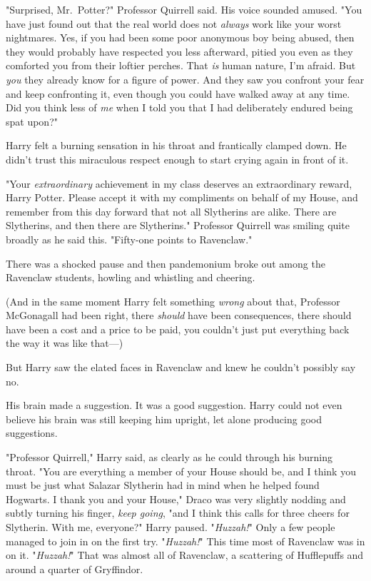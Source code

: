 "Surprised, Mr.~Potter?" Professor Quirrell said. His voice sounded amused. 
"You have just found out that the real world does not \emph{always} work like 
your worst nightmares. Yes, if you had been some poor anonymous boy being 
abused, then they would probably have respected you less afterward, pitied you 
even as they comforted you from their loftier perches. That \emph{is} human 
nature, I'm afraid. But \emph{you} they already know for a figure of power. And 
they saw you confront your fear and keep confronting it, even though you could 
have walked away at any time. Did you think less of \emph{me} when I told you 
that I had deliberately endured being spat upon?"

Harry felt a burning sensation in his throat and frantically clamped down. He 
didn't trust this miraculous respect enough to start crying again in front of 
it.

"Your \emph{extraordinary} achievement in my class deserves an extraordinary 
reward, Harry Potter. Please accept it with my compliments on behalf of my 
House, and remember from this day forward that not all Slytherins are alike. 
There are Slytherins, and then there are Slytherins." Professor Quirrell was 
smiling quite broadly as he said this. "Fifty-one points to Ravenclaw."

There was a shocked pause and then pandemonium broke out among the Ravenclaw 
students, howling and whistling and cheering.

(And in the same moment Harry felt something \emph{wrong} about that, Professor 
McGonagall had been right, there \emph{should} have been consequences, there 
should have been a cost and a price to be paid, you couldn't just put 
everything back the way it was like that---)

But Harry saw the elated faces in Ravenclaw and knew he couldn't possibly say 
no.

His brain made a suggestion. It was a good suggestion. Harry could not even 
believe his brain was still keeping him upright, let alone producing good 
suggestions.

"Professor Quirrell," Harry said, as clearly as he could through his burning 
throat. "You are everything a member of your House should be, and I think you 
must be just what Salazar Slytherin had in mind when he helped found Hogwarts. 
I thank you and your House," Draco was very slightly nodding and subtly turning 
his finger, \emph{keep going}, "and I think this calls for three cheers for 
Slytherin. With me, everyone?" Harry paused. "\emph{Huzzah!}" Only a few people 
managed to join in on the first try. "\emph{Huzzah!}" This time most of 
Ravenclaw was in on it. "\emph{Huzzah!}" That was almost all of Ravenclaw, a 
scattering of Hufflepuffs and around a quarter of Gryffindor.

